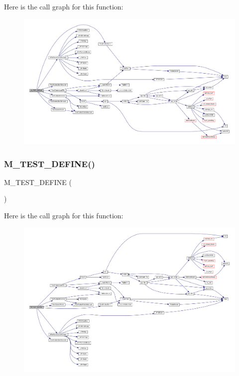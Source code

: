 Here is the call graph for this function\+:
\nopagebreak
\begin{figure}[H]
\begin{center}
\leavevmode
\includegraphics[width=350pt]{test_2text-codec_8c_a7fcb7ef913d255336d6673f6636e2a05_cgraph}
\end{center}
\end{figure}
\mbox{\label{test_2text-codec_8c_af3a282605828c0cb1ae2fc0c5635c566}} 
\subsubsection{\texorpdfstring{M\+\_\+\+T\+E\+S\+T\+\_\+\+D\+E\+F\+I\+N\+E()}{M\_TEST\_DEFINE()}\hspace{0.1cm}{\footnotesize\ttfamily [11/11]}}
{\footnotesize\ttfamily M\+\_\+\+T\+E\+S\+T\+\_\+\+D\+E\+F\+I\+NE (\begin{DoxyParamCaption}\item[{null\+Bytes}]{ }\end{DoxyParamCaption})}

Here is the call graph for this function\+:
\nopagebreak
\begin{figure}[H]
\begin{center}
\leavevmode
\includegraphics[width=350pt]{test_2text-codec_8c_af3a282605828c0cb1ae2fc0c5635c566_cgraph}
\end{center}
\end{figure}
